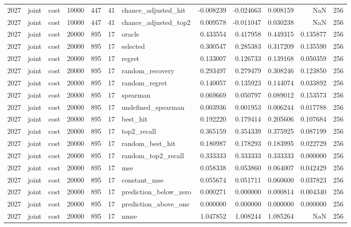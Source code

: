 \begin{tabular}{rllrrrlrrrrr}
2027 & joint & cost & 10000 & 447 & 41 & chance_adjusted_hit & -0.008239 & -0.024663 & 0.008159 & NaN & 256 \\
2027 & joint & cost & 10000 & 447 & 41 & chance_adjusted_top2 & 0.009578 & -0.011047 & 0.030238 & NaN & 256 \\
2027 & joint & cost & 20000 & 895 & 17 & oracle & 0.433554 & 0.417958 & 0.449315 & 0.135877 & 256 \\
2027 & joint & cost & 20000 & 895 & 17 & selected & 0.300547 & 0.285383 & 0.317209 & 0.135590 & 256 \\
2027 & joint & cost & 20000 & 895 & 17 & regret & 0.133007 & 0.126733 & 0.139168 & 0.050359 & 256 \\
2027 & joint & cost & 20000 & 895 & 17 & random_recovery & 0.293497 & 0.279479 & 0.308246 & 0.123850 & 256 \\
2027 & joint & cost & 20000 & 895 & 17 & random_regret & 0.140057 & 0.135923 & 0.144074 & 0.033892 & 256 \\
2027 & joint & cost & 20000 & 895 & 17 & spearman & 0.069669 & 0.050797 & 0.089012 & 0.153573 & 256 \\
2027 & joint & cost & 20000 & 895 & 17 & undefined_spearman & 0.003936 & 0.001953 & 0.006244 & 0.017788 & 256 \\
2027 & joint & cost & 20000 & 895 & 17 & best_hit & 0.192220 & 0.179414 & 0.205606 & 0.107684 & 256 \\
2027 & joint & cost & 20000 & 895 & 17 & top2_recall & 0.365159 & 0.354339 & 0.375925 & 0.087199 & 256 \\
2027 & joint & cost & 20000 & 895 & 17 & random_best_hit & 0.180987 & 0.178293 & 0.183995 & 0.022729 & 256 \\
2027 & joint & cost & 20000 & 895 & 17 & random_top2_recall & 0.333333 & 0.333333 & 0.333333 & 0.000000 & 256 \\
2027 & joint & cost & 20000 & 895 & 17 & mse & 0.058338 & 0.053860 & 0.064007 & 0.042429 & 256 \\
2027 & joint & cost & 20000 & 895 & 17 & constant_mse & 0.055674 & 0.051711 & 0.060600 & 0.037823 & 256 \\
2027 & joint & cost & 20000 & 895 & 17 & prediction_below_zero & 0.000271 & 0.000000 & 0.000814 & 0.004340 & 256 \\
2027 & joint & cost & 20000 & 895 & 17 & prediction_above_one & 0.000000 & 0.000000 & 0.000000 & 0.000000 & 256 \\
2027 & joint & cost & 20000 & 895 & 17 & nmse & 1.047852 & 1.008244 & 1.085264 & NaN & 256 \\

\end{tabular}

